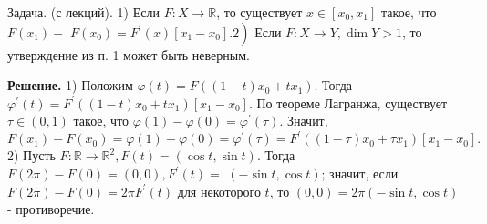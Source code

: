 \begin{task}
    Задача. (с лекций). 1) Если $F: X \rightarrow \mathbb{R}$, то существует $x \in\left[x_0, x_1\right]$ такое, что $F\left(x_1\right)-$ $\left.F\left(x_0\right)=F^{\prime}(x)\left[x_1-x_0\right] .2\right)$ Если $F: X \rightarrow Y, \operatorname{dim} Y>1$, то утверждение из п. 1 может быть неверным.
    
    \textbf{Решение.} 1) Положим $\varphi(t)=F\left((1-t) x_0+t x_1\right)$. Тогда $\varphi^{\prime}(t)=F^{\prime}\left((1-t) x_0+t x_1\right)\left[x_1-x_0\right]$. По теореме Лагранжа, существует $\tau \in(0,1)$ такое, что $\varphi(1)-\varphi(0)=\varphi^{\prime}(\tau)$. Значит,
    $$
    F\left(x_1\right)-F\left(x_0\right)=\varphi(1)-\varphi(0)=\varphi^{\prime}(\tau)=F^{\prime}\left((1-\tau) x_0+\tau x_1\right)\left[x_1-x_0\right] .
    $$
    2) Пусть $F: \mathbb{R} \rightarrow \mathbb{R}^2, F(t)=(\cos t, \sin t)$. Тогда $F(2 \pi)-F(0)=(0,0), F^{\prime}(t)=$ $(-\sin t, \cos t)$; значит, если $F(2 \pi)-F(0)=2 \pi F^{\prime}(t)$ для некоторого $t$, то $(0,0)=2 \pi(-\sin t, \cos t)$ - противоречие.
    
\end{task}